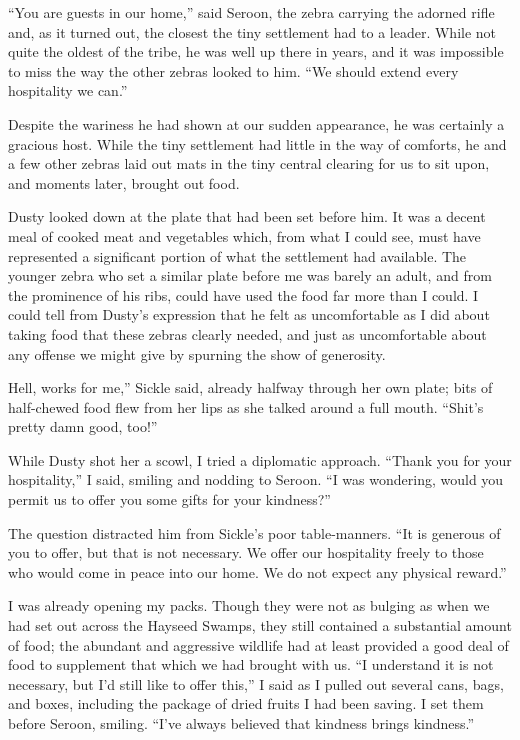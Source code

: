 “You are guests in our home,” said Seroon, the zebra carrying the adorned rifle and, as it turned out, the closest the tiny settlement had to a leader. While not quite the oldest of the tribe, he was well up there in years, and it was impossible to miss the way the other zebras looked to him. “We should extend every hospitality we can.”

Despite the wariness he had shown at our sudden appearance, he was certainly a gracious host. While the tiny settlement had little in the way of comforts, he and a few other zebras laid out mats in the tiny central clearing for us to sit upon, and moments later, brought out food.

Dusty looked down at the plate that had been set before him. It was a decent meal of cooked meat and vegetables which, from what I could see, must have represented a significant portion of what the settlement had available. The younger zebra who set a similar plate before me was barely an adult, and from the prominence of his ribs, could have used the food far more than I could. I could tell from Dusty’s expression that he felt as uncomfortable as I did about taking food that these zebras clearly needed, and just as uncomfortable about any offense we might give by spurning the show of generosity.

\leavevmode{}Hell, works for me,” Sickle said, already halfway through her own plate; bits of half-chewed food flew from her lips as she talked around a full mouth. “Shit’s pretty damn good, too!”

While Dusty shot her a scowl, I tried a diplomatic approach. “Thank you for your hospitality,” I said, smiling and nodding to Seroon. “I was wondering, would you permit us to offer you some gifts for your kindness?”

The question distracted him from Sickle’s poor table-manners. “It is generous of you to offer, but that is not necessary. We offer our hospitality freely to those who would come in peace into our home. We do not expect any physical reward.”

I was already opening my packs. Though they were not as bulging as when we had set out across the Hayseed Swamps, they still contained a substantial amount of food; the abundant and aggressive wildlife had at least provided a good deal of food to supplement that which we had brought with us. “I understand it is not necessary, but I’d still like to offer this,” I said as I pulled out several cans, bags, and boxes, including the package of dried fruits I had been saving. I set them before Seroon, smiling. “I’ve always believed that kindness brings kindness.”

